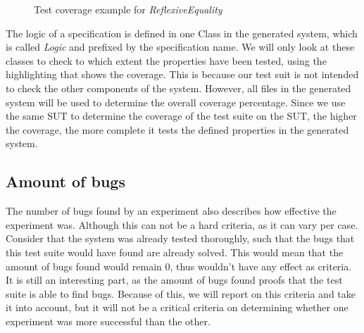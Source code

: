 \FloatBarrier
\begin{figure}[h!]
\caption{Test coverage example for \textit{ReflexiveEquality}}
\label{fig:ch3_eval_e0_highlighting_reflexive-equality}
\centering
\end{figure}
\FloatBarrier
The logic of a specification is defined in one Class in the generated system, which is called \textit{Logic} and prefixed by the specification name. We will only look at these classes to check to which extent the properties have been tested, using the highlighting that shows the coverage. This is because our test suit is not intended to check the other components of the system. However, all files in the generated system will be used to determine the overall coverage percentage. Since we use the same SUT to determine the coverage of the test suite on the SUT, the higher the coverage, the more complete it tests the defined properties in the generated system.

\subsection*{Amount of bugs}
The number of bugs found by an experiment also describes how effective the experiment was. Although this can not be a hard criteria, as it can vary per case. Consider that the system was already tested thoroughly, such that the bugs that this test suite would have found are already solved. This would mean that the amount of bugs found would remain 0, thus wouldn't have any effect as criteria. It is still an interesting part, as the amount of bugs found proofs that the test suite is able to find bugs. Because of this, we will report on this criteria and take it into account, but it will not be a critical criteria on determining whether one experiment was more successful than the other.

